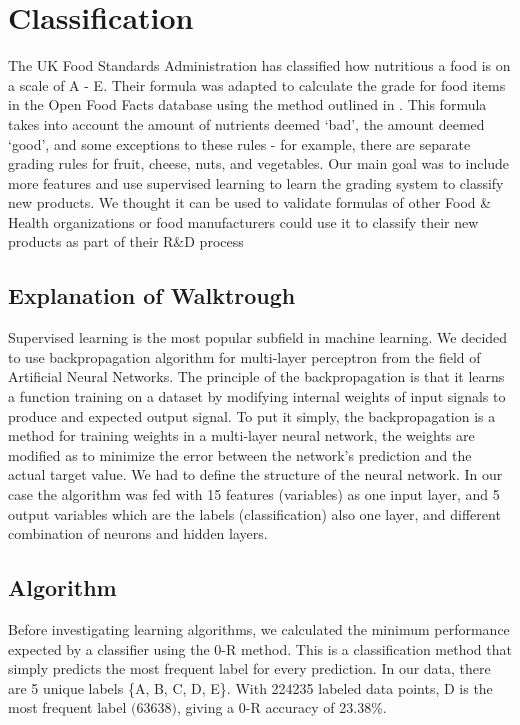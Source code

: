 \documentclass[journal]{IEEEtran}
\begin{document}
\section{Classification}

The UK Food Standards Administration has classified how nutritious a food is on a scale of A - E. Their formula was adapted to calculate the grade for food items in the Open Food Facts database using the method outlined in . This formula takes into account the amount of nutrients deemed ‘bad’, the amount deemed ‘good’, and some exceptions to these rules - for example, there are separate grading rules for fruit, cheese, nuts, and vegetables. Our main goal was to include more features and use supervised learning to learn the grading system to classify new products. We thought it can be used to validate formulas of other Food \& Health organizations or food manufacturers could use it to classify their new products as part of their R\&D process


\subsection{Explanation of Walktrough}

Supervised learning is the most popular subfield in machine learning. We decided to use backpropagation algorithm for multi-layer perceptron from the field of Artificial Neural Networks. The principle of the backpropagation is that it learns a function training on a dataset by modifying internal weights of input signals to produce and expected output signal. To put it simply, the backpropagation is a method for training weights in a multi-layer neural network, the weights are modified as to minimize the error between the network’s prediction and the actual target value. We had to define the structure of the neural network. In our case the algorithm was fed with 15 features (variables) as one input layer, and 5 output variables which are the labels (classification) also one layer, and different combination of neurons and hidden layers.

\subsection{Algorithm}

Before investigating learning algorithms, we calculated the minimum performance expected by a classifier using the 0-R method. This is a classification method that simply predicts the most frequent label for every prediction. In our data, there are 5 unique labels \{A, B, C, D, E\}. With 224235 labeled data points, D is the most frequent label $($63638$)$, giving a 0-R accuracy of 23.38\%.
\end{document}
